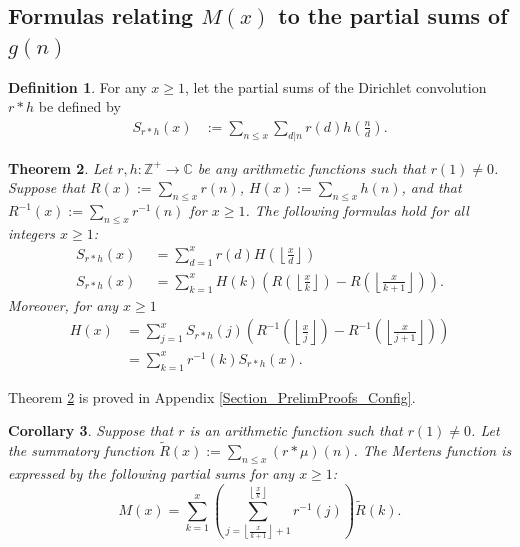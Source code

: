 \documentclass[11pt,reqno,a4letter]{article}
\newcommand{\hlocalref}[1]{\hyperref[#1]{\ref{#1}}}
\numberwithin{equation}{section}
\numberwithin{figure}{section}
\numberwithin{table}{section}
\newcommand{\floor}[1]{\left\lfloor #1 \right\rfloor}
\newcommand{\Floor}[2]{\ensuremath{\left\lfloor \frac{#1}{#2} \right\rfloor}}
\theoremstyle{plain}
\newtheorem{theorem}{Theorem}
\newtheorem{cor}[theorem]{Corollary}
\numberwithin{theorem}{section}
\theoremstyle{definition}
\newtheorem{definition}[theorem]{Definition}
\begin{document}
\subsection{Formulas relating $M(x)$ to the partial sums of $g(n)$} 
\label{subSection_KeyApplications_NewExactFormulasForMx} 

\begin{definition}
For any $x \geq 1$, let the partial sums of the Dirichlet convolution $r \ast h$ be defined by 
\begin{align*} 
S_{r \ast h}(x) & := \sum_{n \leq x} \sum_{d|n} r(d) h\left(\frac{n}{d}\right). 
\end{align*}
\end{definition}

\begin{theorem} 
\label{theorem_SummatoryFuncsOfDirCvls} 
Let $r,h: \mathbb{Z}^{+} \rightarrow \mathbb{C}$ be any 
arithmetic functions such that $r(1) \neq 0$. 
Suppose that $R(x) := \sum_{n \leq x} r(n)$, $H(x) := \sum_{n \leq x} h(n)$, and that 
$R^{-1}(x) := \sum_{n \leq x} r^{-1}(n)$ for $x \geq 1$. 
The following formulas hold for all integers $x \geq 1$: 
\begin{align*} 
S_{r \ast h}(x) & \phantom{:}= \sum_{d=1}^x r(d) H\left(\Floor{x}{d}\right) \\ 
S_{r \ast h}(x) & \phantom{:}= \sum_{k=1}^{x} H(k) \left(R\left(\Floor{x}{k}\right) - 
     R\left(\Floor{x}{k+1}\right)\right). 
\end{align*} 
Moreover, for any $x \geq 1$ 
\begin{align*} 
H(x) & = \sum_{j=1}^{x} S_{r \ast h}(j) \left(R^{-1}\left(\Floor{x}{j}\right) - 
     R^{-1}\left(\Floor{x}{j+1}\right)\right) \\ 
     & = \sum_{k=1}^{x} r^{-1}(k) S_{r \ast h}(x). 
\end{align*} 
\end{theorem} 

Theorem \hlocalref{theorem_SummatoryFuncsOfDirCvls} 
is proved in Appendix \hlocalref{Section_PrelimProofs_Config}. 

\begin{cor} 
\label{cor_CvlGAstMu} 
Suppose that $r$ is an arithmetic function such that 
$r(1) \neq 0$. Let the summatory function 
$\widetilde{R}(x) := \sum_{n \leq x} (r \ast \mu)(n)$. 
The Mertens function is expressed by the following 
partial sums for any $x \geq 1$: 
\[
M(x) = \sum_{k=1}^{x} \left(\sum_{j=\floor{\frac{x}{k+1}}+1}^{\floor{\frac{x}{k}}} r^{-1}(j)\right) 
     \widetilde{R}(k). 
\]
\end{cor} 
\end{document}
